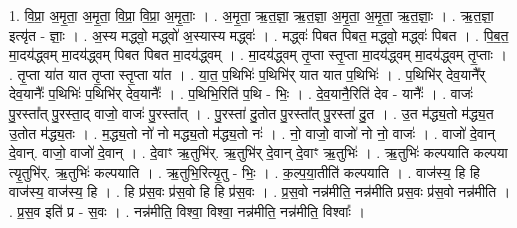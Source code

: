 \documentclass[17pt]{extarticle}
\begin{document}
1. वि॒प्रा॒ अ॒मृ॒ता॒ अ॒मृ॒ता॒ वि॒प्रा॒ वि॒प्रा॒ अ॒मृ॒ताः॒ । . अ॒मृ॒ता॒ ऋ॒त॒ज्ञा॒ ऋ॒त॒ज्ञा॒ अ॒मृ॒ता॒ अ॒मृ॒ता॒ ऋ॒त॒ज्ञाः॒ । . ऋ॒त॒ज्ञा॒ इत्यृ॑त - ज्ञाः॒ । . अ॒स्य मद्ध्वो॒ मद्ध्वो॑ अ॒स्यास्य मद्ध्वः॑ । . मद्ध्वः॑ पिबत पिबत॒ मद्ध्वो॒ मद्ध्वः॑ पिबत । . पि॒ब॒त॒ मा॒दय॑द्ध्वम् मा॒दय॑द्ध्वम् पिबत पिबत मा॒दय॑द्ध्वम् । . मा॒दय॑द्ध्वम् तृ॒प्ता स्तृ॒प्ता मा॒दय॑द्ध्वम् मा॒दय॑द्ध्वम् तृ॒प्ताः । . तृ॒प्ता या॑त यात तृ॒प्ता स्तृ॒प्ता या॑त । . या॒त॒ प॒थिभिः॑ प॒थिभि॑र् यात यात प॒थिभिः॑ । . प॒थिभि॑र् देव॒यानै᳚र् देव॒यानैः᳚ प॒थिभिः॑ प॒थिभि॑र् देव॒यानैः᳚ । . प॒थिभि॒रिति॑ प॒थि - भिः॒ । . दे॒व॒यानै॒रिति॑ देव - यानैः᳚ । . वाजः॑ पु॒रस्ता᳚त् पु॒रस्ता॒द् वाजो॒ वाजः॑ पु॒रस्ता᳚त् । . पु॒रस्ता॑ दु॒तोत पु॒रस्ता᳚त् पु॒रस्ता॑ दु॒त । . उ॒त म॑द्ध्य॒तो म॑द्ध्य॒त उ॒तोत म॑द्ध्य॒तः । . म॒द्ध्य॒तो नो॑ नो मद्ध्य॒तो म॑द्ध्य॒तो नः॑ । . नो॒ वाजो॒ वाजो॑ नो नो॒ वाजः॑ । . वाजो॑ दे॒वान् दे॒वान्. वाजो॒ वाजो॑ दे॒वान् । . दे॒वाꣳ ऋ॒तुभि॑र्. ऋ॒तुभि॑र् दे॒वान् दे॒वाꣳ ऋ॒तुभिः॑ । . ऋ॒तुभिः॑ कल्पयाति कल्पया त्यृ॒तुभि॑र्. ऋ॒तुभिः॑ कल्पयाति । . ऋ॒तुभि॒रित्यृ॒तु - भिः॒ । . क॒ल्प॒या॒तीति॑ कल्पयाति । . वाज॑स्य॒ हि हि वाज॑स्य॒ वाज॑स्य॒ हि । . हि प्र॑स॒वः प्र॑स॒वो हि हि प्र॑स॒वः । . प्र॒स॒वो नन्न॑मीति॒ नन्न॑मीति प्रस॒वः प्र॑स॒वो नन्न॑मीति । . प्र॒स॒व इति॑ प्र - स॒वः । . नन्न॑मीति॒ विश्वा॒ विश्वा॒ नन्न॑मीति॒ नन्न॑मीति॒ विश्वाः᳚ । \newline
\end{document}
